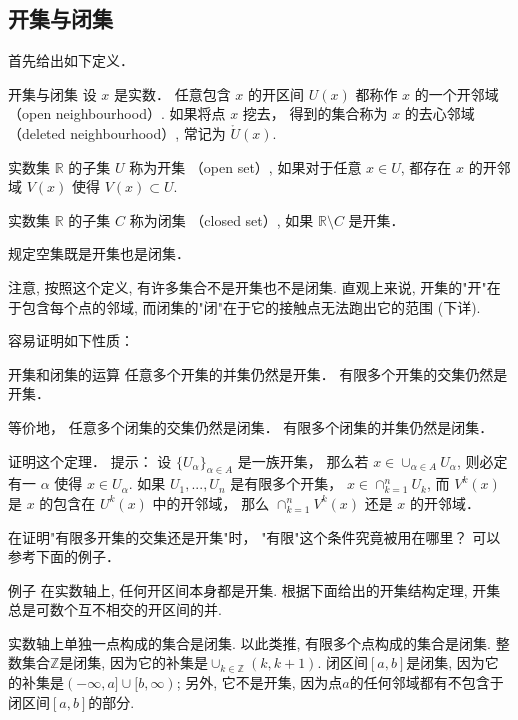 

\subsection{开集与闭集}

首先给出如下定义．

\begin{definition}{开集与闭集}
设 $x$ 是实数． 任意包含 $x$ 的开区间 $U(x)$ 都称作 $x$ 的一个开邻域 （open neighbourhood）. 如果将点 $x$ 挖去， 得到的集合称为 $x$ 的去心邻域 （deleted neighbourhood）, 常记为 $\mathring U(x)$.

实数集 $\mathbb{R}$ 的子集 $U$ 称为开集 （open set）, 如果对于任意 $x\in U$, 都存在 $x$ 的开邻域 $V(x)$ 使得 $V(x)\subset U$. 

实数集 $\mathbb{R}$ 的子集 $C$ 称为闭集 （closed set）, 如果 $\mathbb{R}\setminus C$ 是开集．

规定空集既是开集也是闭集．
\end{definition}

注意, 按照这个定义, 有许多集合不是开集也不是闭集. 直观上来说, 开集的"开"在于包含每个点的邻域, 而闭集的"闭"在于它的接触点无法跑出它的范围 (下详).

容易证明如下性质：

\begin{theorem}{开集和闭集的运算}
任意多个开集的并集仍然是开集． 有限多个开集的交集仍然是开集．

等价地， 任意多个闭集的交集仍然是闭集． 有限多个闭集的并集仍然是闭集．
\end{theorem}

\begin{exercise}{}
证明这个定理． 提示： 设 $\{U_\alpha\}_{\alpha\in A}$ 是一族开集， 那么若 $x\in \cup_{\alpha\in A}U_\alpha$, 则必定有一 $\alpha$ 使得 $x\in U_\alpha$. 如果 $U_1,...,U_n$ 是有限多个开集， $x\in\cap_{k=1}^nU_k$, 而 $V^k(x)$ 是 $x$ 的包含在 $U^k(x)$ 中的开邻域， 那么 $\cap_{k=1}^nV^k(x)$ 还是 $x$ 的开邻域．
\end{exercise}

\begin{exercise}{}
在证明"有限多开集的交集还是开集"时， "有限"这个条件究竟被用在哪里？ 可以参考下面的例子．
\end{exercise}

\begin{example}{例子}
在实数轴上, 任何开区间本身都是开集. 根据下面给出的开集结构定理, 开集总是可数个互不相交的开区间的并.

实数轴上单独一点构成的集合是闭集. 以此类推, 有限多个点构成的集合是闭集. 整数集合$\mathbb{Z}$是闭集, 因为它的补集是$\cup_{k\in\mathbb{Z}}(k,k+1)$. 闭区间$[a,b]$是闭集, 因为它的补集是$(-\infty,a]\cup[b,\infty)$; 另外, 它不是开集, 因为点$a$的任何邻域都有不包含于闭区间$[a,b]$的部分.
\end{example}

